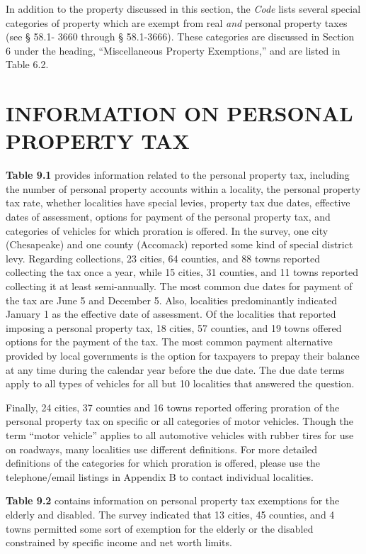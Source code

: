 \documentclass[
]{book}
\begin{document}
In addition to the property discussed in this section, the \emph{Code} lists several special categories of property which are exempt from real \emph{and} personal property taxes (see § 58.1- 3660 through § 58.1-3666). These categories are discussed in Section 6 under the heading, ``Miscellaneous Property Exemptions,'' and are listed in Table 6.2.

\hypertarget{information-on-personal-property-tax}{%
\section{INFORMATION ON PERSONAL PROPERTY TAX}\label{information-on-personal-property-tax}}

\textbf{Table 9.1} provides information related to the personal property tax, including the number of personal property accounts within a locality, the personal property tax rate, whether localities have special levies, property tax due dates, effective dates of assessment, options for payment of the personal property tax, and categories of vehicles for which proration is offered. In the survey, one city (Chesapeake) and one county (Accomack) reported some kind of special district levy. Regarding collections, 23 cities, 64 counties, and 88 towns reported collecting the tax once a year, while 15 cities, 31 counties, and 11 towns reported collecting it at least semi-annually. The most common due dates for payment of the tax are June 5 and December 5. Also, localities predominantly indicated January 1 as the effective date of assessment. Of the localities that reported imposing a personal property tax, 18 cities, 57 counties, and 19 towns offered options for the payment of the tax. The most common payment alternative provided by local governments is the option for taxpayers to prepay their balance at any time during the calendar year before the due date. The due date terms apply to all types of vehicles for all but 10 localities that answered the question.

Finally, 24 cities, 37 counties and 16 towns reported offering proration of the personal property tax on specific or all categories of motor vehicles. Though the term ``motor vehicle'' applies to all automotive vehicles with rubber tires for use on roadways, many localities use different definitions. For more detailed definitions of the categories for which proration is offered, please use the telephone/email listings in Appendix B to contact individual localities.

\textbf{Table 9.2} contains information on personal property tax exemptions for the elderly and disabled. The survey indicated that 13 cities, 45 counties, and 4 towns permitted some sort of exemption for the elderly or the disabled constrained by specific income and net worth limits.
\end{document}
